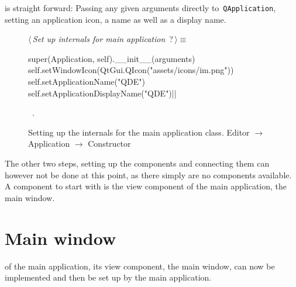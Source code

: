 \documentclass[%
    a4paper,    %
    justified,  %
    nobib,      %
    openany     %
]{tufte-book}
\begin{document}
 is straight forward: Passing any given
arguments directly to~\verb+QApplication+, setting an application icon, a name
as well as a display name.

\begin{figure}[h]
\begin{flushleft} \small
\begin{minipage}{\linewidth}\label{scrap14}\raggedright\small
{} $\langle\,${\itshape Set up internals for main application}\nobreak\ {\footnotesize {?}}$\,\rangle\equiv$
\vspace{-1ex}
\begin{pythoncode}
super(Application, self).__init__(arguments)
self.setWindowIcon(QtGui.QIcon("assets/icons/im.png"))
self.setApplicationName("QDE")
self.setApplicationDisplayName("QDE")|\NWsep|
\end{pythoncode}
\vspace{1.5ex}
\footnotesize
\begin{list}{}{\setlength{\itemsep}{-\parsep}\setlength{\itemindent}{-\leftmargin}}
\item \NWtxtMacroRefIn\ .

\item{}
\end{list}
\end{minipage}\vspace{4ex}
\end{flushleft}
\caption{Setting up the internals for the main application class.
  \newline{}\newline{}Editor $\rightarrow$ Application $\rightarrow$
  Constructor} \label{editor:lst:app:constructor:internals}
\end{figure}

The other two steps, setting up the components and connecting them can however
not be done at this point, as there simply are no components available. A
component to start with is the view component of the main application, the main
window.

\section{Main window}
\label{appendix:sec:editor:main-window}

 of the main application, its
view component, the main window, can now be implemented and then be set up by
the main application.
\end{document}
